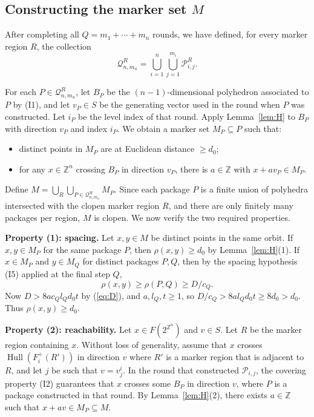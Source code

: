 \documentclass[10pt,a4paper]{amsart}
\DeclareMathOperator{\Hull}{Hull}
\begin{document}
\subsection{Constructing the marker set $M$}

After completing all $Q=m_1+\cdots+m_n$ rounds, we have defined, for
every marker region $R$, the collection
\[
\mathcal{Q}_{n,m_n}^R=
\bigcup_{i=1}^n\bigcup_{j=1}^{m_i}\mathcal{P}_{i,j}^R.
\]

For each $P\in\mathcal{Q}_{n,m_n}^R$, let $B_P$ be the $(n-1)$-dimensional
polyhedron associated to $P$ by (I1), and let $v_P\in S$ be the generating
vector used in the round when $P$ was constructed. Let $i_P$ be the level
index of that round. Apply Lemma~\ref{lem:H} to $B_P$ with direction $v_P$
and index $i_P$. We obtain a marker set $M_P\subseteq P$ such that:
\begin{itemize}
\item distinct points in $M_P$ are at Euclidean distance $\geq d_0$;
\item for any $x\in\mathbb{Z}^n$ crossing $B_P$ in direction $v_P$,
there is $a\in\mathbb{Z}$ with $x+av_P\in M_P$.
\end{itemize}

Define
$M=\bigcup_{R}\bigcup_{P\in\mathcal{Q}_{n,m_n}^R} M_P$.
Since each package $P$ is a finite union of polyhedra intersected with the
clopen marker region $R$, and there are only finitely many packages per
region, $M$ is clopen. We now verify the two required properties.

\medskip\noindent
\textbf{Property (1): spacing.}
Let $x,y\in M$ be distinct points in the same orbit. If $x,y\in M_P$ for
the same package $P$, then $\rho(x,y)\geq d_0$ by Lemma~\ref{lem:H}(1).
If $x\in M_P$ and $y\in M_Q$ for distinct packages $P,Q$, then by the
spacing hypothesis (I5) applied at the final step $Q$,
\[
\rho(x,y)\geq \rho(P,Q)\geq D/c_Q.
\]
Now $D>8a c_Q l_Q d_0 t$ by (\ref{eq:D}), and $a, l_Q, t\geq 1$, so
$D/c_Q > 8a l_Q d_0 t \geq 8d_0 > d_0$. Thus $\rho(x,y)\geq d_0$.

\medskip\noindent
\textbf{Property (2): reachability.}
Let $x\in F(2^{\mathbb{Z}^n})$ and $v\in S$. Let $R$ be the marker region
containing $x$. Without loss of generality, assume that $x$ crosses $\Hull(F^+_i(R'))$ in direction $v$ where $R'$ is a marker region that is adjacent to $R$, and let
$j$ be such that $v=v_j^i$. In the round that constructed
$\mathcal{P}_{i,j}$, the covering property (I2) guarantees that $x$
crosses some $B_P$ in direction $v$, where $P$ is a package constructed
in that round. By
Lemma~\ref{lem:H}(2), there exists $a\in\mathbb{Z}$ such that
$x+av\in M_P\subseteq M$.
\end{document}

